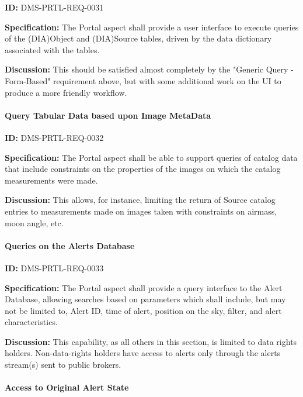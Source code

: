 \documentclass[SE,toc,lsstdraft]{lsstdoc}
\begin{document}
\label{DMS-PRTL-REQ-0031}
\textbf{ID:} DMS-PRTL-REQ-0031

\textbf{Specification:}
The Portal aspect shall provide a user interface to execute queries of the (DIA)Object and (DIA)Source tables, driven by the data dictionary associated with the tables.

\textbf{Discussion:}
This should be satisfied almost completely by the "Generic Query - Form-Based" requirement above, but with some additional work on the UI to produce a more friendly workflow.

\paragraph{Query Tabular Data based upon Image MetaData}\hfill  %

\label{DMS-PRTL-REQ-0032}
\textbf{ID:} DMS-PRTL-REQ-0032

\textbf{Specification:}
The Portal aspect shall be able to support queries of catalog data that include constraints on the properties of the images on which the catalog measurements were made.

\textbf{Discussion:}
This allows, for instance, limiting the return of Source catalog entries to measurements made on images taken with constraints on airmass, moon angle, etc.

\paragraph{Queries on the Alerts Database}\hfill  %

\label{DMS-PRTL-REQ-0033}
\textbf{ID:} DMS-PRTL-REQ-0033

\textbf{Specification:}
The Portal aspect shall provide a query interface to the Alert Database, allowing searches based on parameters which shall include, but may not be limited to, Alert ID, time of alert, position on the sky, filter, and alert characteristics.

\textbf{Discussion:}
This capability, as all others in this section, is limited to data rights holders.  Non-data-rights holders have access to alerts only through the alerts stream(s) sent to public brokers.

\paragraph{Access to Original Alert State}\hfill  %
\end{document}
